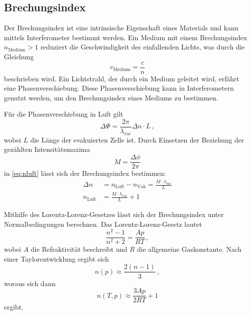 \subsection{Brechungsindex} \label{sec:n}

Der Brechungsindex ist eine intrinsische Eigenschaft eines Materials und kann mittels Interferometer bestimmt werden. Ein Medium mit einem Brechungsindex $n_\text{Medium} > 1$ reduziert die Geschwindigkeit des einfallenden Lichts, was durch die Gleichung
\begin{equation*}
    v_\text{Medium} = \frac{c}{n}
\end{equation*}
beschrieben wird. Ein Lichtstrahl, der durch ein Medium geleitet wird, erfährt eine Phasenverschiebung. Diese Phasenverschiebung kann in Interferometern genutzt werden, um den Brechungsindex eines Mediums zu bestimmen.

Für die Phasenverschiebung in Luft gilt
\begin{equation} \label{eq:nluft}
    \Delta \Phi = \frac{2 \pi}{\lambda_\text{vac}} \Delta n \cdot L \, ,
\end{equation}
wobei $L$ die Länge der evakuierten Zelle ist. Durch Einsetzen der Beziehung der gezählten Intensitätsmaxima 
\begin{equation} \label{eq:maxima}
    M = \frac{\Delta \phi}{2 \pi}
\end{equation}
in \autoref{eq:nluft} lässt sich der Brechungsindex bestimmen:
\begin{align} \label{eq:nluft2}
    \Delta n &= n_\text{Luft} - n_\text{Vak} = \frac{M \cdot \lambda_\text{vac}}{L} \nonumber \\
    n_\text{Luft} &= \frac{M \cdot \lambda_\text{vac}}{L} + 1
\end{align}

Mithilfe des Lorentz-Lorenz-Gesetzes lässt sich der Brechungsindex unter Normalbedingungen berechnen. Das Lorentz-Lorenz-Gesetz lautet
\begin{equation*}
    \frac{n^2 - 1}{n^2 + 2} = \frac{A p}{R T} \, ,
\end{equation*}
wobei $A$ die Refraktivität beschreibt und $R$ die allgemeine Gaskonstante. Nach einer Taylorentwicklung ergibt sich
\begin{equation*}
    n(p) \approx \frac{2 (n-1)}{3} \, ,
\end{equation*} 
woraus sich dann
\begin{equation} \label{eq:lorentz}
    n (T,p) \approx \frac{3 A p}{ 2 R T} + 1
\end{equation}
ergibt.

